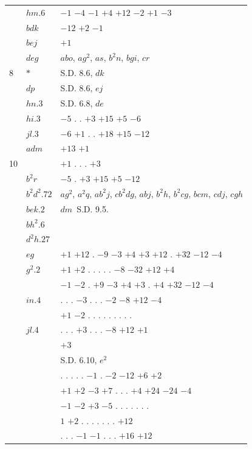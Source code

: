 \documentclass[11pt]{article}
\begin{document}
\begin{center}
\begin{tabular}{lll}
& $hm.6$ & $-1$ $-4$ $-1$ $+4$ $+12$ $-2$ $+1$ $-3$ \\
& $bdk$ & \quad\quad\quad\quad\quad\quad $-12$ $+2$ $-1$ \\
& $bej$ & $+1$ \\
& $deg$ & $abo$, $ag^{2}$, $as$, $b^{2}n$, $bgi$, $cr$ \\
8 & $*$ & \quad\quad\quad\quad\quad\quad S.D. 8.6, $dk$ \\
& $dp$ & \quad\quad\quad\quad\quad\quad S.D. 8.6, $ej$ \\
& $hn.3$ & \quad\quad\quad\quad\quad\quad S.D. 6.8, $de$ \\
& $hi.3$ & $-5$ \quad . \quad . \quad $+3$ $+15$ $+5$ $-6$ \\
& $jl.3$ & $-6$ $+1$ \quad . \quad . \quad $+18$ $+15$ $-12$ \\
& $adm$ & \quad\quad\quad\quad\quad\quad $+13$ \quad $+1$ \\
10 & & $+1$ \quad . \quad . \quad . \quad $+3$ \\
& $b^{2}r$ & $-5$ \quad . \quad $+3$ $+15$ $+5$ $-12$ \\
& $b^{2}d^{2}.72$ & $ag^{2}$, $a^{2}q$, $ab^{2}j$, $cb^{2}dg$, $abj$, $b^{2}h$, $b^{2}cg$, $bcm$, $cdj$, $cgh$ \\
& $bek.2$ & \quad\quad\quad\quad\quad\quad $dm$\ S.D. 9.5. \\
& $bh^{2}.6$ & \\
& $d^{2}h.27$ & \\
& $eg$ & \quad\quad $+1$ $+12$ \quad . \quad $-9$ $-3$ $+4$ $+3$ $+12$ \quad . \quad $+32$ $-12$ $-4$ \\
& $g^{2}.2$ & \quad\quad $+1$ $+2$ \quad . \quad . \quad . \quad . \quad . \quad $-8$ $-32$ $+12$ $+4$ \\
& & $-1$ $-2$ \quad . \quad $+9$ $-3$ $+4$ $+3$ \quad . \quad $+4$ $+32$ $-12$ $-4$ \\
& $in.4$ & . \quad . \quad . \quad $-3$ \quad . \quad . \quad . \quad $-2$ $-8$ $+12$ $-4$ \\
& & $+1$ $-2$ \quad . \quad . \quad . \quad . \quad . \quad . \quad . \quad . \quad . \\
& $jl.4$ & . \quad . \quad . \quad $+3$ \quad . \quad . \quad . \quad $-8$ $+12$ $+1$ \\
& & \quad\quad $+3$ \\
& & \quad\quad\quad\quad\quad\quad S.D. 6.10, $e^{2}$ \\
& & . \quad . \quad . \quad . \quad . \quad $-1$ \quad . \quad $-2$ $-12$ $+6$ $+2$ \\
& & $+1$ $+2$ $-3$ $+7$ \quad . \quad . \quad . \quad $+4$ $+24$ $-24$ $-4$ \\
& & $-1$ $-2$ $+3$ $-5$ \quad . \quad . \quad . \quad . \quad . \quad . \quad . \\
& & $1$ $+2$ \quad . \quad . \quad . \quad . \quad . \quad . \quad . \quad $+12$ \\
& & . \quad . \quad . \quad $-1$ $-1$ \quad . \quad . \quad . \quad $+16$ $+12$ \\
\end{tabular}
\end{center}
\end{document}
